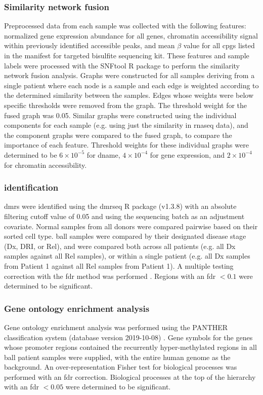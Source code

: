 \subsubsection{Similarity network fusion}

Preprocessed data from each sample was collected with the following features: normalized gene expression abundance for all genes, chromatin accessibility signal within previously identified accessible peaks, and mean $\beta$ value for all \glspl{cpg} listed in the manifest for targeted bisulfite sequencing kit.
These features and sample labels were processed with the SNFtool R package \cite{wangSimilarityNetworkFusion2014} to perform the similarity network fusion analysis.
Graphs were constructed for all samples deriving from a single patient where each node is a sample and each edge is weighted according to the determined similarity between the samples.
Edges whose weights were below specific thresholds were removed from the graph.
The threshold weight for the fused graph was 0.05.
Similar graphs were constructed using the individual components for each sample (e.g. using just the similarity in \gls{rnaseq} data), and the component graphs were compared to the fused graph, to compare the importance of each feature.
Threshold weights for these individual graphs were determined to be $6 \times 10^{-5}$ for \gls{dname}, $4 \times 10^{-4}$ for gene expression, and $2 \times 10^{-4}$ for chromatin accessibility.

\subsubsection{ identification}

\Glspl{dmr} were identified using the dmrseq R package (v1.3.8) \cite{korthauerDetectionAccurateFalse2018} with an absolute filtering cutoff value of 0.05 and using the sequencing batch as an adjustment covariate.
Normal samples from all donors were compared pairwise based on their sorted cell type.
\Gls{ball} samples were compared by their designated disease stage (Dx, DRI, or Rel), and were compared both across all patients (e.g. all Dx samples against all Rel samples), or within a single patient (e.g. all Dx samples from Patient 1 against all Rel samples from Patient 1).
A multiple testing correction with the \gls{fdr} method was performed \cite{benjaminiControllingFalseDiscovery1995}.
Regions with an \gls{fdr} $< 0.1$ were determined to be significant.

\subsubsection{Gene ontology enrichment analysis}

Gene ontology enrichment analysis was performed using the PANTHER classification system (database version 2019-10-08) \cite{miLargescaleGeneFunction2013}.
Gene symbols for the genes whose promoter regions contained the recurrently hyper-methylated regions in all \gls{ball} patient samples were supplied, with the entire human genome as the background.
An over-representation Fisher test for biological processes was performed with an \gls{fdr} correction.
Biological processes at the top of the hierarchy with an \gls{fdr} $< 0.05$ were determined to be significant.
